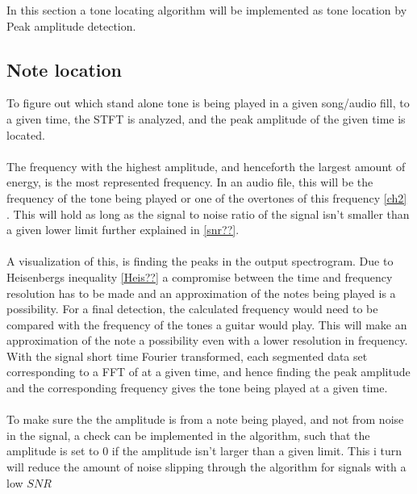 In this section a tone locating algorithm will be implemented as tone location by Peak amplitude detection.
\subsection{Note location}
To figure out which stand alone tone is being played in a given song/audio fill, to a given time, the STFT is analyzed, and the peak amplitude of the given time is located.\\
\\
The frequency with the highest amplitude, and henceforth the largest amount of energy, is the most represented frequency. 
In an audio file, this will be the frequency of the tone being played or one of the overtones of this frequency \ref{ch2} .
This will hold as long as the signal to noise ratio of the signal isn't smaller than a given lower limit further explained in \ref{snr??}. 
\\
\\
A visualization of this, is finding the peaks in the output spectrogram.
Due to Heisenbergs inequality \ref{Heis??}  a compromise between the time and frequency resolution has to be made and an approximation of the notes being played is a possibility.
For a final detection, the calculated frequency would need to be compared with the frequency of the tones a guitar would play. 
This will make an approximation of the note a possibility even with a lower resolution in frequency.
\\
With the signal short time Fourier transformed, each segmented data set corresponding to a FFT of at a given time, and hence finding the peak amplitude and the corresponding frequency gives the tone being played at a given time.
\\\\
To make sure the the amplitude is from a note being played, and not from noise in the signal, a check can be implemented in the algorithm, such that the amplitude is set to $0$ if the amplitude isn't larger than a given limit.
This i turn will reduce the amount of noise slipping through the algorithm for signals with a low $SNR$

